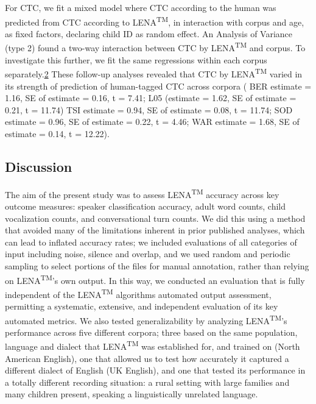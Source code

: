\documentclass[english,floatsintext,man]{apa6}
\begin{document}
For CTC, we fit a mixed model where CTC according to the human was
predicted from CTC according to LENA\textsuperscript{TM}, in interaction
with corpus and age, as fixed factors, declaring child ID as random
effect. An Analysis of Variance (type 2) found a two-way interaction
between CTC by LENA\textsuperscript{TM} and corpus. To investigate this
further, we fit the same regressions within each corpus
separately.\href{For\%20both\%20TSI\%20and\%20WAR,\%20the\%20variance\%20associated\%20to\%20the\%20child\%20ID\%20random\%20factor\%20was\%20zero.\%20This\%20suggests\%20a\%20mixed\%20model\%20was\%20not\%20necessary,\%20as\%20child\%20ID\%20is\%20not\%20explaining\%20any\%20additional\%20variance,\%20but\%20it\%20does\%20not\%20alter\%20the\%20interpretation\%20in\%20the\%20main\%20text.}{2}
These follow-up analyses revealed that CTC by LENA\textsuperscript{TM}
varied in its strength of prediction of human-tagged CTC across corpora
( BER estimate = 1.16, SE of estimate = 0.16, t = 7.41; L05 (estimate =
1.62, SE of estimate = 0.21, t = 11.74) TSI estimate = 0.94, SE of
estimate = 0.08, t = 11.74; SOD estimate = 0.96, SE of estimate = 0.22,
t = 4.46; WAR estimate = 1.68, SE of estimate = 0.14, t = 12.22).

\subsection{Discussion}\label{discussion}

The aim of the present study was to assess LENA\textsuperscript{TM}
accuracy across key outcome measures: speaker classification accuracy,
adult word counts, child vocalization counts, and conversational turn
counts. We did this using a method that avoided many of the limitations
inherent in prior published analyses, which can lead to inflated
accuracy rates; we included evaluations of all categories of input
including noise, silence and overlap, and we used random and periodic
sampling to select portions of the files for manual annotation, rather
than relying on LENA\textsuperscript{TM}'s own output. In this way, we
conducted an evaluation that is fully independent of the
LENA\textsuperscript{TM} algorithms automated output assessment,
permitting a systematic, extensive, and independent evaluation of its
key automated metrics. We also tested generalizability by analyzing
LENA\textsuperscript{TM}'s performance across five different corpora;
three based on the same population, language and dialect that
LENA\textsuperscript{TM} was established for, and trained on (North
American English), one that allowed us to test how accurately it
captured a different dialect of English (UK English), and one that
tested its performance in a totally different recording situation: a
rural setting with large families and many children present, speaking a
linguistically unrelated language.
\end{document}
